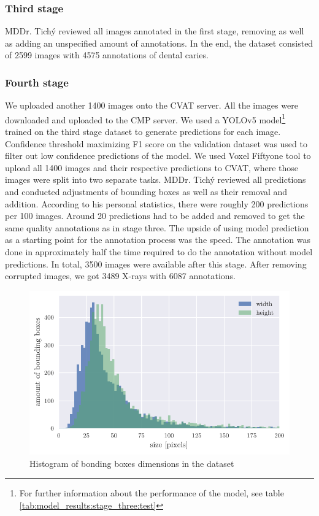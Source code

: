 \subsubsection{Third stage}
\label{sec:dataset:third_stage}
MDDr. Tichý reviewed all images annotated in the first stage, removing as well as adding an unspecified amount of annotations. In the end, the dataset consisted of 2599 images with 4575 annotations of dental caries.

\subsubsection{Fourth stage}
\label{sec:dataset:fourth_stage}
We uploaded another 1400 images onto the CVAT server. All the images were downloaded and uploaded to the CMP server. We used a  YOLOv5 model\footnote{For further information about the performance of the model, see table \ref{tab:model_results:stage_three:test}} trained on the third stage dataset to generate predictions for each image. Confidence threshold maximizing F1 score on the validation dataset was used to filter out low confidence predictions of the model. We used Voxel Fiftyone tool to upload all 1400 images and their respective predictions to CVAT, where those images were split into two separate tasks.
MDDr. Tichý reviewed all predictions and conducted adjustments of bounding boxes as well as their removal and addition.  According to his personal statistics, there were roughly 200 predictions per 100 images. Around 20 predictions had to be added and removed to get the same quality annotations as in stage three. The upside of using model prediction as a starting point for the annotation process was the speed. The annotation was done in approximately half the time required to do the annotation without model predictions. In total, 3500 images were available after this stage. After removing corrupted images, we got 3489 X-rays with 6087 annotations.

\begin{figure}
    \includegraphics[width = 0.9\linewidth]{images/dataset_histogram.pdf}
    \caption{Histogram of bonding boxes dimensions in the dataset}
    \label{fig:hist_caries_dim}
\end{figure}

